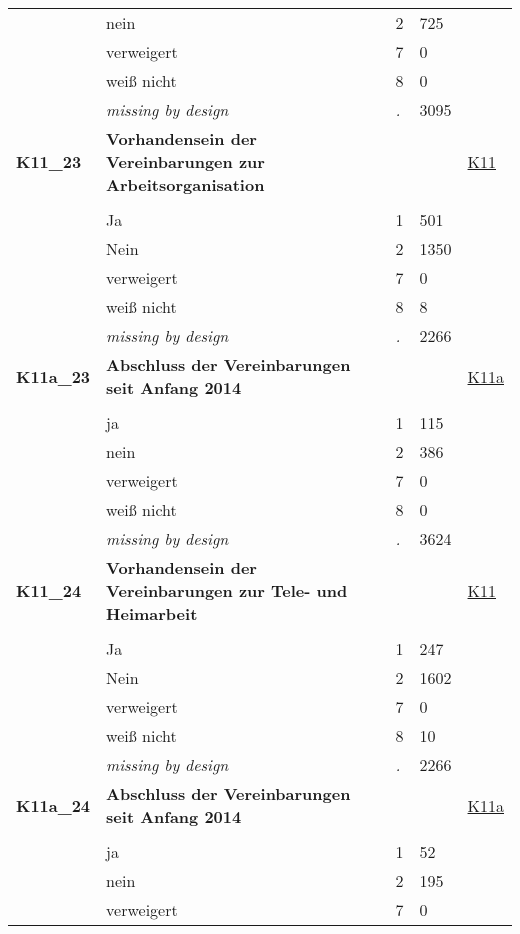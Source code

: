\begin{longtable}{| L{2.65cm} | L{8cm} | C{1.5cm} | R{1.25cm} | C{2.25cm}  |}
   & nein & 2 & 725 &  \\ 
   & verweigert & 7 & 0 &  \\ 
   & weiß nicht & 8 & 0 &  \\ 
   & \textit{missing by design} & \textit{.} & 3095 &  \\ 
   \midrule
\textbf{K11\_23}\label{var:K11:23} & \textbf{Vorhandensein der Vereinbarungen zur Arbeitsorganisation} &  &  & \hyperref[K11]{K11} \\ 
   &  &  &  &  \\ 
   & Ja & 1 & 501 &  \\ 
   & Nein & 2 & 1350 &  \\ 
   & verweigert & 7 & 0 &  \\ 
   & weiß nicht & 8 & 8 &  \\ 
   & \textit{missing by design} & \textit{.} & 2266 &  \\ 
   \midrule
\textbf{K11a\_23}\label{var:K11a:23} & \textbf{Abschluss der Vereinbarungen seit Anfang 2014} &  &  & \hyperref[K11a]{K11a} \\ 
   &  &  &  &  \\ 
   & ja & 1 & 115 &  \\ 
   & nein & 2 & 386 &  \\ 
   & verweigert & 7 & 0 &  \\ 
   & weiß nicht & 8 & 0 &  \\ 
   & \textit{missing by design} & \textit{.} & 3624 &  \\ 
   \midrule
\textbf{K11\_24}\label{var:K11:24} & \textbf{Vorhandensein der Vereinbarungen zur Tele- und Heimarbeit} &  &  & \hyperref[K11]{K11} \\ 
   &  &  &  &  \\ 
   & Ja & 1 & 247 &  \\ 
   & Nein & 2 & 1602 &  \\ 
   & verweigert & 7 & 0 &  \\ 
   & weiß nicht & 8 & 10 &  \\ 
   & \textit{missing by design} & \textit{.} & 2266 &  \\ 
   \midrule
\textbf{K11a\_24}\label{var:K11a:24} & \textbf{Abschluss der Vereinbarungen seit Anfang 2014} &  &  & \hyperref[K11a]{K11a} \\ 
   &  &  &  &  \\ 
   & ja & 1 & 52 &  \\ 
   & nein & 2 & 195 &  \\ 
   & verweigert & 7 & 0 &  \\ 

\end{longtable}
